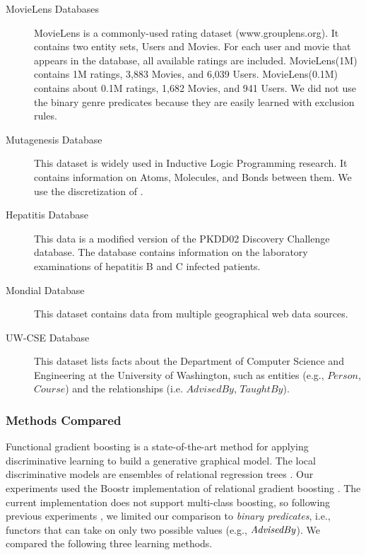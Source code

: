 \documentclass[runningheads,a4paper]{llncs}
\begin{document}
\begin{description}

\item[MovieLens Databases] MovieLens is a  commonly-used rating dataset (www.grouplens.org). %
It contains two entity sets, Users and Movies. For each user and movie that appears in the database, all available ratings are included. MovieLens(1M) contains 1M ratings, 3,883 Movies, and 6,039 Users. MovieLens(0.1M) contains about 0.1M ratings, 1,682 Movies, and 941 Users. We did not use the binary genre predicates because they are easily learned with exclusion rules.


\item[Mutagenesis Database] This dataset is widely used in Inductive Logic Programming research. 
It contains information on Atoms, Molecules, and Bonds between them. We use the discretization of \cite{Schulte2012}.

\item[Hepatitis Database] This data is a modified version of the PKDD02 Discovery Challenge database. %
The database contains information on the laboratory examinations of hepatitis B and C infected patients. 

\item[Mondial Database] 
This dataset contains data from multiple geographical web data sources. 


\item[UW-CSE Database] This dataset lists facts about the Department of Computer Science and Engineering at the University of Washington, such as entities (e.g., $Person$, $Course$) and the relationships (i.e. $AdvisedBy$, $TaughtBy$).

\end{description}

\subsubsection{Methods Compared} Functional gradient boosting is a state-of-the-art method for applying discriminative learning to build a generative graphical model. The local discriminative models are  ensembles of relational regression trees \cite{Khot2011}. Our experiments used the Boostr implementation of relational gradient boosting \cite{Khot2013}. The current implementation does not support multi-class boosting, so following previous experiments \cite{Khot2011}, we limited our comparison to {\em binary predicates}, i.e., functors that can take on only two possible values (e.g., $\it{AdvisedBy}$). We compared the following three learning methods.
\end{document}
